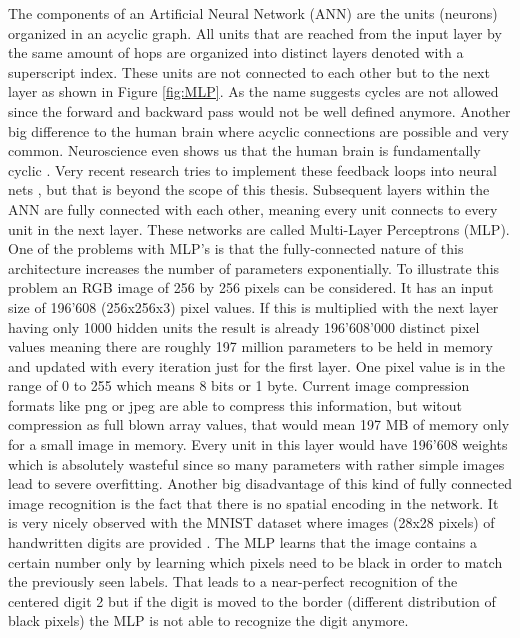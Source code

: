 The components of an Artificial Neural Network (ANN) are the units (neurons) organized in an acyclic graph. All units that are reached from the input layer by the same amount of hops are organized into distinct layers denoted with a superscript index. These units are not connected to each other but to the next layer as shown in Figure \ref{fig:MLP}. As the name suggests cycles are not allowed since the forward and backward pass would not be well defined anymore. Another big difference to the human brain where acyclic connections are possible and very common. Neuroscience even shows us that the human brain is fundamentally cyclic \cite{goodale1992separate}. Very recent research tries to implement these feedback loops into neural nets \cite{caswell2016loopy}, but that is beyond the scope of this thesis. Subsequent layers within the ANN are fully connected with each other, meaning every unit connects to every unit in the next layer. These networks are called Multi-Layer Perceptrons (MLP). One of the problems with MLP's is that the fully-connected nature of this architecture increases the number of parameters exponentially. To illustrate this problem an RGB image of 256 by 256 pixels can be considered. It has an input size of 196'608 (256x256x3) pixel values. If this is multiplied with the next layer having only 1000 hidden units the result is already 196'608'000 distinct pixel values meaning there are roughly 197 million parameters to be held in memory and updated with every iteration just for the first layer. One pixel value is in the range of 0 to 255 which means 8 bits or 1 byte. Current image compression formats like png or jpeg are able to compress this information, but witout compression as full blown array values, that would mean 197 MB of memory only for a small image in memory. Every unit in this layer would have 196'608 weights which is absolutely wasteful since so many parameters with rather simple images lead to severe overfitting. Another big disadvantage of this kind of fully connected image recognition is the fact that there is no spatial encoding in the network. It is very nicely observed with the MNIST dataset where images (28x28 pixels) of handwritten digits are provided \cite{MNISTdatabase}. The MLP learns that the image contains a certain number only by learning which pixels need to be black in order to match the previously seen labels. That leads to a near-perfect recognition of the centered digit 2 but if the digit is moved to the border (different distribution of black pixels) the MLP is not able to recognize the digit anymore.

